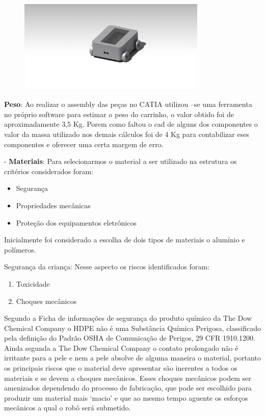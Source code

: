 \begin{figure}[H]
    \centering
    \includegraphics[width=0.8\textwidth]{figuras/estrutura_catia.eps}
    \caption{}
    \label{fig:catia01}
\end{figure}

\textbf{Peso}: Ao realizar o assembly das peças no CATIA utilizou –se uma ferramenta no próprio software para estimar o peso do carrinho, o valor obtido foi de aproximadamente 3,5 Kg. Porem como faltou o cad de alguns dos componentes o valor da massa utilizado nos demais cálculos foi de 4 Kg para contabilizar eses componentes e oferecer uma certa margem de erro.


- \textbf{Materiais}:
Para selecionarmos o material a ser utilizado na estrutura os critérios considerados foram:
\begin{itemize}
\item Segurança
\item Propriedades mecânicas
\item Proteção dos equipamentos eletrônicos
\end{itemize}

Inicialmente foi considerado a escolha de dois tipos de materiais o alumínio e polímeros.
 
Segurança da criança: Nesse aspecto os riscos identificados foram:
\begin{enumerate}
\item Toxicidade
\item Choques mecânicos
\end{enumerate}

Segundo a Ficha de informações de segurança do produto químico da The Dow Chemical Company o HDPE não é uma Substância Química Perigosa, classificado pela definição do Padrão OSHA de Comunicação de Perigos, 29 CFR 1910.1200. Ainda segunda a The Dow Chemical Company o contato prolongado não é irritante para a pele e nem a pele absolve de alguma maneira o material, portanto os principais riscos que o material deve apresentar são inerentes a todos os materiais e se devem a choques mecânicos. Esses choques mecânicos podem ser amenizados dependendo do processo de fabricação, que pode ser escolhido para produzir um material mais ‘macio’ e que ao mesmo tempo aguente os esforços mecânicos a qual o robô será submetido.

